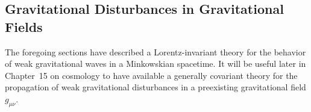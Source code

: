 
\subsection{Gravitational Disturbances in Gravitational Fields\optionalreading}
\label{sec:10.9}
\begingroup
\renewcommand{\thefootnote}{*}
\begin{NoHyper}
\end{NoHyper}
\endgroup

The foregoing sections have described a Lorentz-invariant theory for the
behavior of weak gravitational waves in a Minkowskian spacetime. It will be
useful later in Chapter~15 on cosmology to have available a generally
covariant theory for the propagation of weak gravitational disturbances in a
preexisting gravitational field \(g_{\mu\nu}\).

